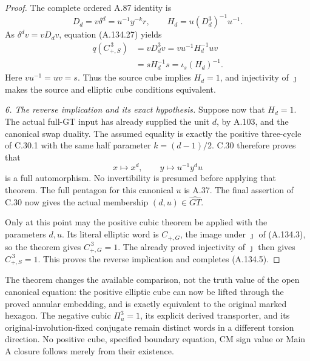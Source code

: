 \begin{proof}
The complete ordered A.87 identity is
\[
 D_d=v\delta^d=u^{-1}y^{-k}r,\qquad
                       H_d=u(D_d^3)^{-1}u^{-1}.
 \tag{A.134.28}
\]
As \(\delta^dv=vD_dv\), equation (A.134.27) yields
\[
 \begin{aligned}
 q(C_{+,S}^{\,3})
   &=vD_d^3v
     =vu^{-1}H_d^{-1}uv\\
   &=sH_d^{-1}s
     =\iota_s(H_d)^{-1}.
 \end{aligned}
 \tag{A.134.29}
\]
Here \(vu^{-1}=uv=s\). Thus the source cube implies
\(H_d=1\), and injectivity of \(\jmath\) makes the
source and elliptic cube conditions equivalent.

\emph{6. The reverse implication and its exact hypothesis.}
Suppose now that \(H_d=1\). The actual full-GT input has
already supplied the unit \(d\), by A.103, and the
canonical swap duality. The assumed equality is exactly
the positive three-cycle of C.30.1 with the same half
parameter \(k=(d-1)/2\).
C.30 therefore proves that
\[
                  x\longmapsto x^d,\qquad
                  y\longmapsto u^{-1}y^du
 \tag{A.134.30}
\]
is a full automorphism. No invertibility is presumed
before applying that theorem.
The full pentagon for this canonical \(u\) is A.37.
The final assertion of C.30 now gives the actual
membership \((d,u)\in\widehat{GT}\).

Only at this point may the positive cubic theorem
\citep[Proposition~2.20(1), equation~(18)]{A_Enriquez2014}
be applied with the parameters \(d,u\). Its literal
elliptic word is \(C_{+,G}\), the image under \(\jmath\)
of (A.134.3), so the theorem gives \(C_{+,G}^{\,3}=1\).
The already proved injectivity of \(\jmath\) then gives
\(C_{+,S}^{\,3}=1\). This proves the reverse implication
and completes (A.134.5).
\end{proof}

The theorem changes the available comparison, not the
truth value of the open canonical equation: the positive
elliptic cube can now be lifted through the proved
annular embedding, and is exactly equivalent to the
original marked hexagon. The negative cubic
\(\Pi_u^3=1\), its explicit derived transporter, and its
original-involution-fixed conjugate remain distinct
words in a different torsion direction. No positive
cube, specified boundary equation, CM sign value or
Main A closure follows merely from their existence.

